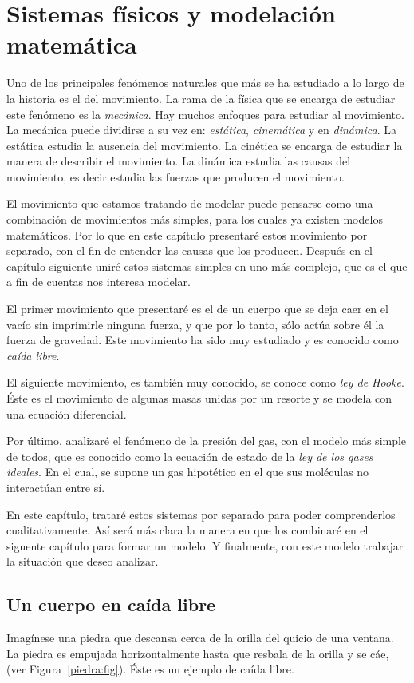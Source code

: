 \chapter{Sistemas físicos y modelación matemática}

Uno de los principales fenómenos naturales que más se ha estudiado a lo largo de la historia es el del movimiento.
La rama de la física que se encarga de estudiar este fenómeno es la \emph{mecánica}.
Hay muchos enfoques para estudiar al movimiento.
La mecánica puede dividirse a su vez en: \emph{estática}, \emph{cinemática} y en \emph{dinámica}.
La estática estudia la ausencia del movimiento.
La cinética se encarga de estudiar la manera de describir el movimiento.
La dinámica estudia las causas del movimiento, es decir estudia las fuerzas que producen el movimiento.

El movimiento que estamos tratando de modelar puede pensarse como una combinación de movimientos más simples, para los cuales ya existen modelos matemáticos.
Por lo que en este capítulo presentaré estos movimiento por separado, con el fin de entender las causas que los producen.
Después en el capítulo siguiente uniré estos sistemas simples en uno más complejo, que es el que a fin de cuentas nos interesa modelar.

El primer movimiento que presentaré es el de un cuerpo que se deja caer en el vacío sin imprimirle ninguna fuerza, y que por lo tanto, sólo actúa sobre él la fuerza de gravedad.
Este movimiento ha sido muy estudiado y es conocido como \emph{caída libre}. 

El siguiente movimiento, es también muy conocido, se conoce como \emph{ley de Hooke}.
Éste es el movimiento de algunas masas unidas por un resorte y se modela con una ecuación diferencial.

Por último, analizaré el fenómeno de la presión del gas, con el modelo más simple de todos, que es conocido como la ecuación de estado de la \emph{ley de los gases ideales}.
En el cual, se supone un gas hipotético en el que sus moléculas no interactúan entre sí.

En este capítulo, trataré estos sistemas por separado para poder comprenderlos cualitativamente.
Así será más clara la manera en que los combinaré en el siguente capítulo para formar un modelo.
Y finalmente, con este modelo trabajar la situación que deseo analizar.

\section{Un cuerpo en caída libre}
Imagínese una piedra que descansa cerca de la orilla del quicio de una ventana.
La piedra es empujada horizontalmente hasta que resbala de la orilla y se cáe, (ver Figura~\ref{piedra:fig}).
Éste es un ejemplo de caída libre.


